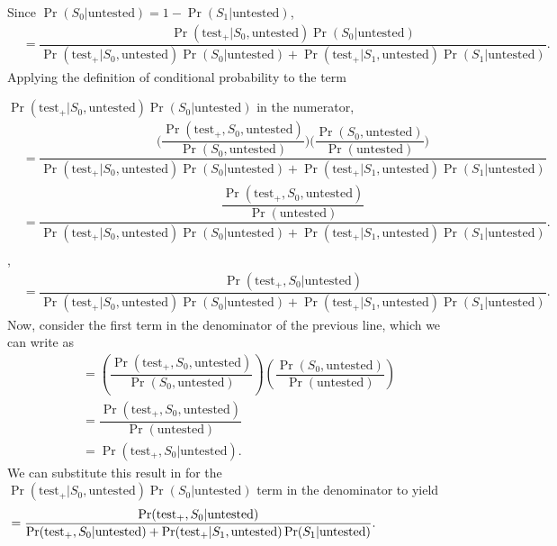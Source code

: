 \documentclass[12pt,twoside]{smiththesis}
\begin{document}
\noindent Since \(\Pr(S_0|\text{untested}) = 1 - \Pr(S_1|\text{untested})\),
\begin{align*} 
&=  \dfrac{{\Pr(\text{test}_+|S_0, \text{untested})}\Pr(S_0|\text{untested})}{\Pr(\text{test}_+|S_0, \text{untested})\Pr(S_0|\text{untested}) + \Pr(\text{test}_+|S_1, \text{untested}) \Pr(S_1|\text{untested})}.
\end{align*}
Applying the definition of conditional probability to the term

\noindent \(\Pr(\text{test}_+|S_0, \text{untested})\Pr(S_0|\text{untested})\) in the numerator,
\begin{align*}
&=
    \dfrac{\Big( \dfrac{\Pr(\text{test}_+,S_0, \text{untested})}{\Pr(S_0, \text{untested})} \Big) \Big(\dfrac{\Pr(S_0, \text{untested})}{\Pr(\text{untested})}\Big)}{\Pr(\text{test}_+|S_0, \text{untested})\Pr(S_0|\text{untested}) + \Pr(\text{test}_+|S_1, \text{untested}) \Pr(S_1|\text{untested})}\\ 
    &=  \dfrac{\dfrac{\Pr(\text{test}_+,S_0, \text{untested})}{\Pr(\text{untested})}}{\Pr(\text{test}_+|S_0, \text{untested})\Pr(S_0|\text{untested}) + \Pr(\text{test}_+|S_1, \text{untested}) \Pr(S_1|\text{untested})}.\\
    \end{align*}
,
\begin{align*} 
    &=  \dfrac{{\Pr(\text{test}_+,S_0|\text{untested})}}
 {\Pr(\text{test}_+|S_0, \text{untested})\Pr(S_0|\text{untested}) + \Pr(\text{test}_+|S_1, \text{untested}) \Pr(S_1|\text{untested})} .
\end{align*}
Now, consider the first term in the denominator of the previous line, which we can write as \begin{align*} &= \left(\dfrac{\Pr(\text{test}_+,S_0,\text{untested})}{\Pr(S_0,\text{untested})} \right) \left( \dfrac{\Pr(S_0,\text{untested})}{\Pr(\text{untested})}\right)\\
&= \dfrac{\Pr(\text{test}_+,S_0,\text{untested})}{\Pr(\text{untested})} \\
&=  \Pr(\text{test}_+,S_0|\text{untested}).
\end{align*}
\noindent We can substitute this result in for the \(\Pr(\text{test}_+|S_0, \text{untested})\Pr(S_0|\text{untested})\) term in the denominator to yield
\begin{align*}
  &=  \dfrac{{\Pr(\text{test}_+,S_0|\text{untested})}}{\Pr(\text{test}_+,S_0|\text{untested}) + \Pr(\text{test}_+|S_1, \text{untested}) \Pr(S_1|\text{untested})}. \hspace{ 20 mm }
\end{align*}
\end{document}

